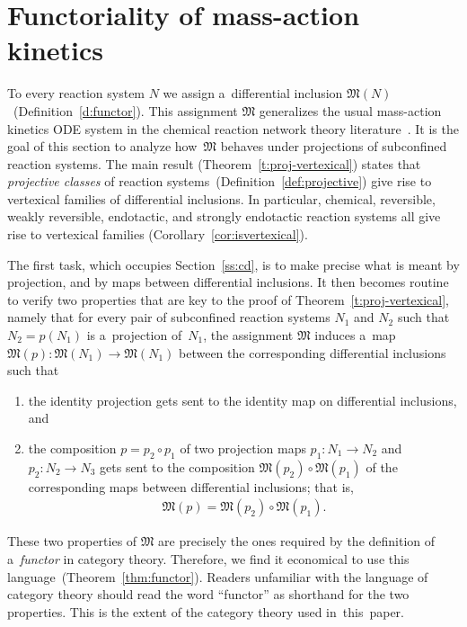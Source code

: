 \documentclass[pdftex]{sigma}
\begin{document}
\section{Functoriality of mass-action kinetics}
\label{sec:funct}

To every reaction system $N$ we assign a~dif\/ferential inclusion $\mathfrak{M}(N)$~(Def\/inition~\ref{d:functor}).
This assignment $\mathfrak{M}$ generalizes the usual mass-action kinetics ODE system in the chemical reaction network
theory literature~\cite{Fein79,HornJackson}.
It is the goal of this section to analyze how~$\mathfrak M$ behaves under projections of subconf\/ined reaction systems.
The main result (Theorem~\ref{t:proj-vertexical}) states that \emph{projective classes} of reaction
systems~(Def\/inition~\ref{def:projective}) give rise to vertexical families of dif\/ferential inclusions.
In particular, chemical, reversible, weakly reversible, endotactic, and strongly endotactic reaction systems all give
rise to vertexical families (Corollary~\ref{cor:isvertexical}).

The f\/irst task, which occupies Section~\ref{ss:cd}, is to make precise what is meant by projection, and by maps
between dif\/ferential inclusions.
It then becomes routine to verify two properties that are key to the proof of Theorem~\ref{t:proj-vertexical}, namely
that for every pair of subconf\/ined reaction systems $N_1$ and $N_2$ such that $N_2=p(N_1)$ is a~projection of~$N_1$,
the assignment $\mathfrak{M}$ induces a~map $\mathfrak{M}(p):\mathfrak{M}(N_1)\to\mathfrak{M}(N_1)$ between the
corresponding dif\/ferential inclusions such that
\begin{enumerate}\itemsep=0pt
\item[1)] the identity projection gets sent to the identity map on dif\/ferential inclusions, and
\item[2)] the composition
$p=p_2\circ p_1$ of two projection maps $p_1:N_1\to N_2$ and $p_2:N_2\to N_3$ gets sent to the composition
$\mathfrak{M}(p_2)\circ\mathfrak{M}(p_1)$ of the corresponding maps between dif\/ferential inclusions; that is,
\begin{gather*}
\mathfrak{M}(p)=\mathfrak{M}(p_2)\circ\mathfrak{M}(p_1).
\end{gather*}
\end{enumerate}

These two properties of $\mathfrak{M}$ are precisely the ones required by the def\/inition of a~\emph{functor} in
category theory.
Therefore, we f\/ind it economical to use this language~(Theorem~\ref{thm:functor}).
Readers unfamiliar with the language of category theory should read the word ``functor'' as shorthand for the two
properties.
This is the extent of the category theory used in~this~paper.
\end{document}
